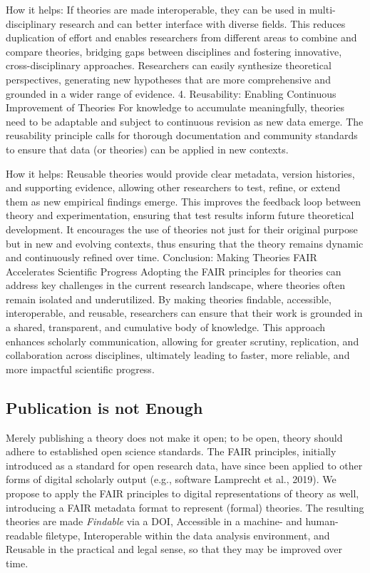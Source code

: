 \documentclass[
  man]{apa6}
\begin{document}
How it helps: If theories are made interoperable, they can be used in multi-disciplinary research and can better interface with diverse fields. This reduces duplication of effort and enables researchers from different areas to combine and compare theories, bridging gaps between disciplines and fostering innovative, cross-disciplinary approaches. Researchers can easily synthesize theoretical perspectives, generating new hypotheses that are more comprehensive and grounded in a wider range of evidence.
4. Reusability: Enabling Continuous Improvement of Theories
For knowledge to accumulate meaningfully, theories need to be adaptable and subject to continuous revision as new data emerge. The reusability principle calls for thorough documentation and community standards to ensure that data (or theories) can be applied in new contexts.

How it helps: Reusable theories would provide clear metadata, version histories, and supporting evidence, allowing other researchers to test, refine, or extend them as new empirical findings emerge. This improves the feedback loop between theory and experimentation, ensuring that test results inform future theoretical development. It encourages the use of theories not just for their original purpose but in new and evolving contexts, thus ensuring that the theory remains dynamic and continuously refined over time.
Conclusion: Making Theories FAIR Accelerates Scientific Progress
Adopting the FAIR principles for theories can address key challenges in the current research landscape, where theories often remain isolated and underutilized. By making theories findable, accessible, interoperable, and reusable, researchers can ensure that their work is grounded in a shared, transparent, and cumulative body of knowledge. This approach enhances scholarly communication, allowing for greater scrutiny, replication, and collaboration across disciplines, ultimately leading to faster, more reliable, and more impactful scientific progress.

\subsection{Publication is not Enough}\label{publication-is-not-enough}

Merely publishing a theory does not make it open;
to be open, theory should adhere to established open science standards.
The FAIR principles, initially introduced as a standard for open research data, have since been applied to other forms of digital scholarly output (e.g., software Lamprecht et al., 2019).
We propose to apply the FAIR principles to digital representations of theory as well,
introducing a FAIR metadata format to represent (formal) theories.
The resulting theories are made \emph{Findable} via a DOI,
Accessible in a machine- and human-readable filetype,
Interoperable within the data analysis environment,
and Reusable in the practical and legal sense, so that they may be improved over time.
\end{document}
